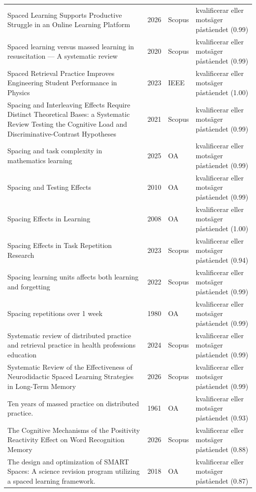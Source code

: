 \begin{longtable}{@{}%
  >{\raggedright\arraybackslash}p{}c%
  >{\raggedright\arraybackslash}p{}%
  >{\raggedright\arraybackslash}p{}@{}}
Spaced Learning Supports Productive Struggle in an Online Learning Platform & 2026 & Scopus & kvalificerar eller motsäger påståendet (0.99) \\
Spaced learning versus massed learning in resuscitation --- A systematic review & 2020 & Scopus & kvalificerar eller motsäger påståendet (0.99) \\
Spaced Retrieval Practice Improves Engineering Student Performance in Physics & 2023 & IEEE & kvalificerar eller motsäger påståendet (1.00) \\
Spacing and Interleaving Effects Require Distinct Theoretical Bases: a Systematic Review Testing the Cognitive Load and Discriminative-Contrast Hypotheses & 2021 & Scopus & kvalificerar eller motsäger påståendet (0.99) \\
Spacing and task complexity in mathematics learning & 2025 & OA & kvalificerar eller motsäger påståendet (0.99) \\
Spacing and Testing Effects & 2010 & OA & kvalificerar eller motsäger påståendet (0.99) \\
Spacing Effects in Learning & 2008 & OA & kvalificerar eller motsäger påståendet (1.00) \\
Spacing Effects in Task Repetition Research & 2023 & Scopus & kvalificerar eller motsäger påståendet (0.94) \\
Spacing learning units affects both learning and forgetting & 2022 & Scopus & kvalificerar eller motsäger påståendet (0.99) \\
Spacing repetitions over 1 week & 1980 & OA & kvalificerar eller motsäger påståendet (0.99) \\
Systematic review of distributed practice and retrieval practice in health professions education & 2024 & Scopus & kvalificerar eller motsäger påståendet (0.99) \\
Systematic Review of the Effectiveness of Neurodidactic Spaced Learning Strategies in Long-Term Memory & 2026 & Scopus & kvalificerar eller motsäger påståendet (0.99) \\
Ten years of massed practice on distributed practice. & 1961 & OA & kvalificerar eller motsäger påståendet (0.93) \\
The Cognitive Mechanisms of the Positivity Reactivity Effect on Word Recognition Memory & 2026 & Scopus & kvalificerar eller motsäger påståendet (0.88) \\
The design and optimization of SMART Spaces: A science revision program utilizing a spaced learning framework. & 2018 & OA & kvalificerar eller motsäger påståendet (0.87) \\

\end{longtable}
